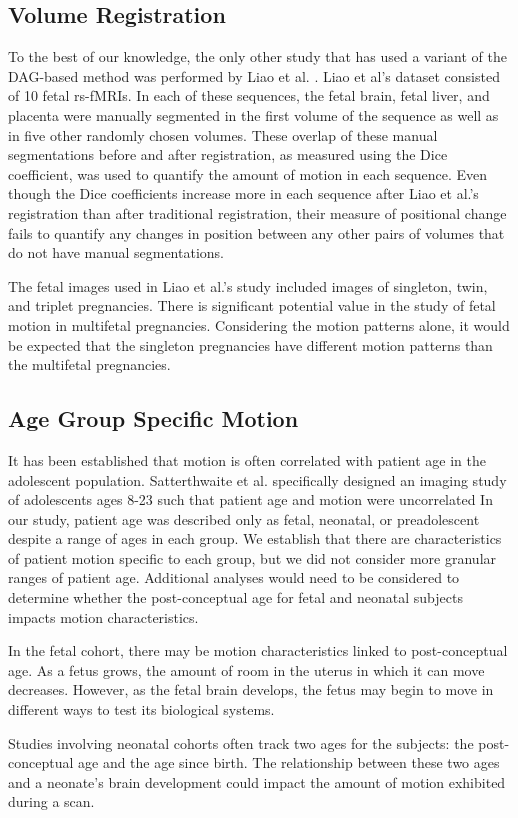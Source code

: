 \subsection{Volume Registration} 

To the best of our knowledge, the only other study that has used a variant of the DAG-based method was performed by Liao et al. \cite{Liao2016}. Liao et al’s dataset consisted of 10 fetal rs-fMRIs. In each of these sequences, the fetal brain, fetal liver, and placenta were manually segmented in the first volume of the sequence as well as in five other randomly chosen volumes. These overlap of these manual segmentations before and after registration, as measured using the Dice coefficient, was used to quantify the amount of motion in each sequence. Even though the Dice coefficients increase more in each sequence after Liao et al.’s registration than after traditional registration, their measure of positional change fails to quantify any changes in position between any other pairs of volumes that do not have manual segmentations. 

The fetal images used in Liao et al.'s study included images of singleton, twin, and triplet pregnancies. There is significant potential value in the study of fetal motion in multifetal pregnancies. Considering the motion patterns alone, it would be expected that the singleton pregnancies have different motion patterns than the multifetal pregnancies.

\subsection{Age Group Specific Motion}

It has been established that motion is often correlated with patient age in the adolescent population. Satterthwaite et al. specifically designed an imaging study of adolescents ages 8-23 such that patient age and motion were uncorrelated \cite{Satterthwaite2012} %
In our study, patient age was described only as fetal, neonatal, or preadolescent despite a range of ages in each group. We establish that there are characteristics of patient motion specific to each group, but we did not consider more granular ranges of patient age. Additional analyses would need to be considered to determine whether the post-conceptual age for fetal and neonatal subjects impacts motion characteristics. 

In the fetal cohort, there may be motion characteristics linked to post-conceptual age. As a fetus grows, the amount of room in the uterus in which it can move decreases. However, as the fetal brain develops, the fetus may begin to move in different ways to test its biological systems. 

Studies involving neonatal cohorts often track two ages for the subjects: the post-conceptual age and the age since birth. The relationship between these two ages and a neonate's brain development could impact the amount of motion exhibited during a scan.

